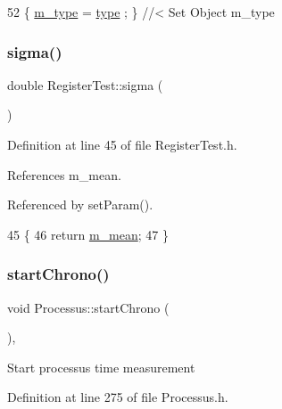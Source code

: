 \begin{DoxyCode}
52 \{ \hyperlink{classObject_a457a600fe8c00eb1034374f75110a78c}{m\_type}  = \hyperlink{classObject_a84f99f70f144a83e1582d1d0f84e4e62}{type}  ; \} \textcolor{comment}{//< Set Object m\_type}
\end{DoxyCode}
\mbox{\label{classRegisterTest_af2a1f9ac2798188e52198fc264ae55cc}} 
\subsubsection{\texorpdfstring{sigma()}{sigma()}}
{\footnotesize\ttfamily double Register\+Test\+::sigma (\begin{DoxyParamCaption}{ }\end{DoxyParamCaption})\hspace{0.3cm}{\ttfamily [inline]}}



Definition at line 45 of file Register\+Test.\+h.



References m\+\_\+mean.



Referenced by set\+Param().


\begin{DoxyCode}
45                 \{
46     \textcolor{keywordflow}{return} \hyperlink{classRegisterTest_aba5ac8088017236617d2244fc0c261b9}{m\_mean};
47   \}
\end{DoxyCode}
\mbox{\label{classProcessus_a5e4d34b86241fa0756e07375a14ff4b2}} 
\subsubsection{\texorpdfstring{start\+Chrono()}{startChrono()}}
{\footnotesize\ttfamily void Processus\+::start\+Chrono (\begin{DoxyParamCaption}{ }\end{DoxyParamCaption})\hspace{0.3cm}{\ttfamily [inline]}, {\ttfamily [inherited]}}

Start processus time measurement 

Definition at line 275 of file Processus.\+h.



